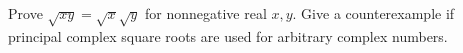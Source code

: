 Prove $\sqrt{xy}=\sqrt x\sqrt y$ for nonnegative real $x,y$. Give a counterexample if principal complex square roots are used for arbitrary complex numbers.
